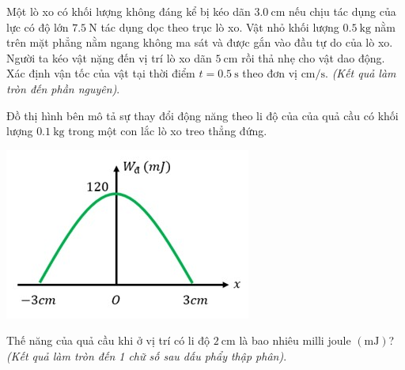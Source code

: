 \begin{ex}
Một lò xo có khối lượng không đáng kể bị kéo dãn $\SI{3.0}{\centi\meter}$ nếu chịu tác dụng của lực có độ lớn $\SI{7.5}{\newton}$ tác dụng dọc theo trục lò xo. Vật nhỏ khối lượng $\SI{0.5}{\kilogram}$ nằm trên mặt phẳng nằm ngang không ma sát và được gắn vào đầu tự do của lò xo. Người ta kéo vật nặng đến vị trí lò xo dãn $\SI{5}{\centi\meter}$ rồi thả nhẹ cho vật dao động. Xác định vận tốc của vật tại thời điểm $t=\SI{0.5}{\second}$ theo đơn vị $\si{\centi\meter/\second}$. \textit{(Kết quả làm tròn đến phần nguyên)}.
\end{ex}
\begin{ex}
	Đồ thị hình bên mô tả sự thay đổi động năng theo li độ của của quả cầu có khối lượng $\SI{0.1}{\kilogram}$ trong một con lắc lò xo treo thẳng đứng.
	\begin{center}
		\includegraphics[width=0.35\linewidth]{../figs/D11-005-1}
	\end{center}
	Thế năng của quả cầu khi ở vị trí có li độ $\SI{2}{\centi\meter}$ là bao nhiêu milli joule $\left(\si{\milli\joule}\right)$? \textit{(Kết quả làm tròn đến 1 chữ số sau dấu phẩy thập phân)}.
\end{ex}
